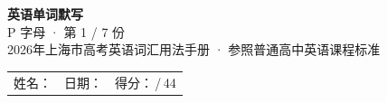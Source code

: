 \documentclass[10pt,a4paper]{article}
\begin{document}
\pagestyle{plain}

\begin{center}
{\LARGE\bfseries 英语单词默写}\\[0.22em]
{\large P 字母 · 第 1 / 7 份}\\[0.18em]
{\small 2026年上海市高考英语词汇用法手册 · 参照普通高中英语课程标准}
\end{center}

\vspace{0.25em}
\noindent\begin{tabular}{@{}p{}@{}p{}@{}p{}@{}}
姓名：\underline{\hspace{2.0cm}} & 日期：\underline{\hspace{2.0cm}} & 得分：\underline{\hspace{1.3cm}}\,/\,44 \\
\end{tabular}

\vspace{0.3em}

\vspace{0.08em}
\end{document}

